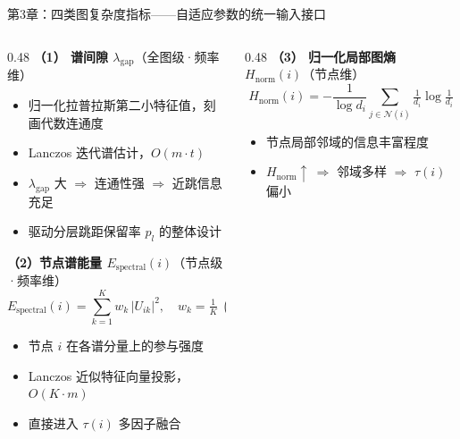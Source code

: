 \documentclass[aspectratio=169,9pt,xcolor=dvipsnames]{beamer}
\newcommand{\blue}[1]{\textcolor{mynavy}{#1}}
\begin{document}
\begin{frame}{第3章：四类图复杂度指标——自适应参数的统一输入接口}
  \begin{columns}[T]
    \begin{column}{0.48\textwidth}
      \textbf{\blue{（1） 谱间隙 $\lambda_{\mathrm{gap}}$}}（全图级·频率维）
      \begin{itemize}
        \item 归一化拉普拉斯第二小特征值，刻画代数连通度
        \item Lanczos 迭代谱估计，$O(m\cdot t)$
        \item $\lambda_{\mathrm{gap}}$ 大 $\Rightarrow$ 连通性强 $\Rightarrow$ 近跳信息充足
        \item 驱动分层跳距保留率 $p_l$ 的整体设计
      \end{itemize}

      \vspace{0.2cm}
      \textbf{\blue{（2）节点谱能量 $E_{\mathrm{spectral}}(i)$}}（节点级·频率维）
      \begin{equation*}
        E_{\mathrm{spectral}}(i) = \sum_{k=1}^{K}w_k\,|U_{ik}|^2,\quad
        w_k=\tfrac{1}{K}\ (\text{等权})
      \end{equation*}
      \begin{itemize}
        \item 节点 $i$ 在各谱分量上的参与强度
        \item Lanczos 近似特征向量投影，$O(K\cdot m)$
        \item 直接进入 $\tau(i)$ 多因子融合
      \end{itemize}
    \end{column}

    \begin{column}{0.48\textwidth}
      \textbf{\blue{（3） 归一化局部图熵 $H_{\mathrm{norm}}(i)$}}（节点维）
      \begin{equation*}
        H_{\mathrm{norm}}(i)
        =-\frac{1}{\log d_i}\sum_{j\in\mathcal{N}(i)}\tfrac{1}{d_i}\log\tfrac{1}{d_i}
      \end{equation*}
                  \vspace{-0.1cm}
      \begin{itemize}
        \item 节点局部邻域的信息丰富程度
        \item $H_{\mathrm{norm}}\uparrow\ \Rightarrow$ 邻域多样 $\Rightarrow$ $\tau(i)$ 偏小
      \end{itemize}


\end{column}
\end{columns}
\end{frame}
\end{document}
